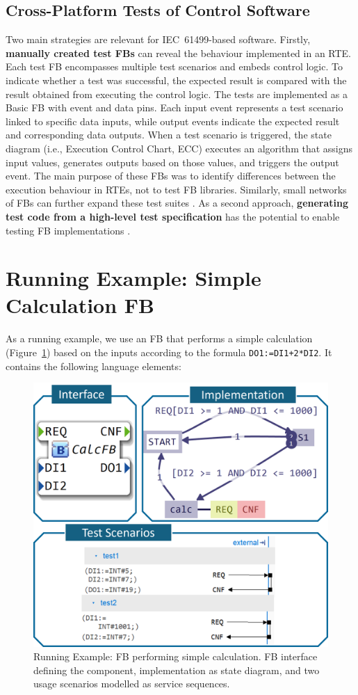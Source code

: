 \begin{bibunit}
\subsection{Cross-Platform Tests of Control Software}
Two main strategies are relevant for IEC~61499-based software. Firstly, \textbf{manually created test FBs} \cite{Testing_Midhun} can reveal the behaviour implemented in an RTE. Each test FB encompasses multiple test scenarios and embeds control logic. To indicate whether a test was successful, the expected result is compared with the result obtained from executing the control logic. The tests are implemented as a Basic FB with event and data pins. Each input event represents a test scenario linked to specific data inputs, while output events indicate the expected result and corresponding data outputs. When a test scenario is triggered, the state diagram (i.e., Execution Control Chart, ECC) executes an algorithm that assigns input values, generates outputs based on those values, and triggers the output event. The main purpose of these FBs was to identify differences between the execution behaviour in RTEs, not to test FB libraries. Similarly, small networks of FBs can further expand these test suites \cite{pfefferkorn,Wiesmayr.2023}. 
As a second approach, \textbf{generating test code from a high-level test specification} has the potential to enable testing FB implementations \cite{biancaMidhunETFAwip}.

\section{Running Example: Simple Calculation FB}
\label{sec::running_example}
As a running example, we use an FB that performs a simple calculation (Figure~\ref{fig:running_example}) based on the inputs according to the formula \texttt{DO1:=DI1+2*DI2}. It contains the following language elements:

\begin{figure}[!htbp]
    \centering
    \includegraphics[width=0.75\columnwidth]{MX_Papers/Paper10/Figures/RunningExample.png}
    \caption{Running Example: FB performing simple calculation. FB interface defining the component, implementation as state diagram, and two usage scenarios modelled as service sequences.}
    \label{fig:running_example}
\end{figure}


\end{bibunit}
